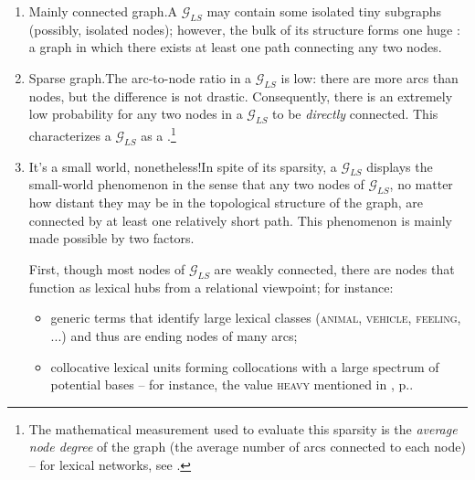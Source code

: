 \begin{enumerate}

\item[A)] Mainly connected graph.\enskip{}A $\mathcal{G}_{LS}$ may contain some isolated tiny subgraphs (possibly, isolated nodes); however, the bulk of its structure forms one huge : a graph in which there exists at least one path connecting any two nodes.

\item[B)] Sparse graph.\enskip{}The arc-to-node ratio in a $\mathcal{G}_{LS}$ is low: there are more arcs than nodes, but the difference is not drastic. Consequently, there is an extremely low probability for any two nodes in a $\mathcal{G}_{LS}$ to be \emph{directly} connected. This characterizes a $\mathcal{G}_{LS}$ as a .\footnote{\label{fn:nodeDegree}The mathematical measurement used to evaluate this sparsity is the \emph{average node degree} of the graph (the average number of arcs connected to each node) -- for lexical networks, see \textcite[Sec.~2]{GaumeEtAl2010}.}

\item[C)] It's a small world, nonetheless!\enskip In spite of its sparsity, a $\mathcal{G}_{LS}$ displays the small-world phenomenon in the sense that any two nodes of $\mathcal{G}_{LS}$, no matter how distant they may be in the topological structure of the graph, are connected by at least one relatively short path. This phenomenon is mainly made possible by two factors.

First, though most nodes of $\mathcal{G}_{LS}$ are weakly connected, there are nodes that function as lexical hubs from a relational viewpoint; for instance:

\begin{itemize}

\item generic terms that identify large lexical classes (\textsc{animal}, \textsc{vehicle}, \textsc{feeling}, ...) and thus are ending nodes of many  arcs;
\item collocative lexical units forming collocations with a large spectrum of potential bases -- for instance, the  value \textsc{heavy} mentioned in , p.\thinspace\pageref{txt:HEAVY-Adj-2}.


\end{itemize}
\end{enumerate}
